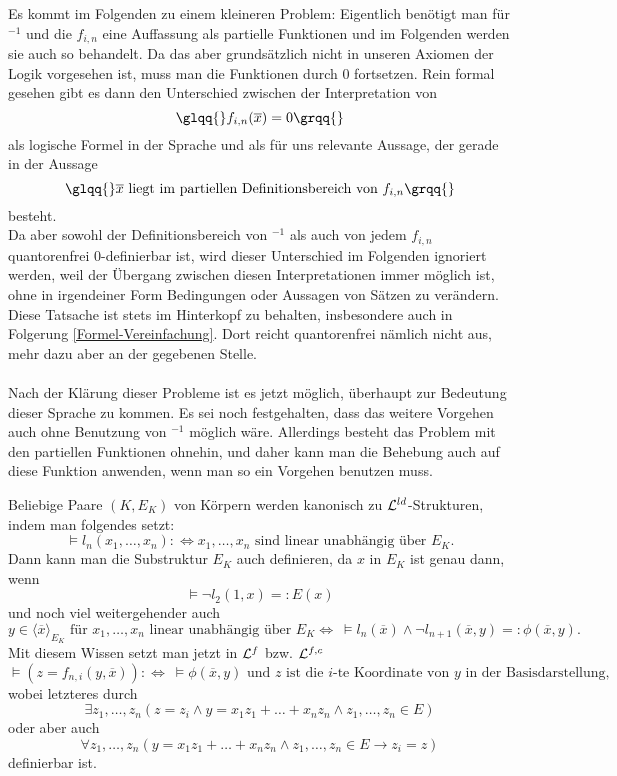     Es kommt im Folgenden zu einem kleineren Problem: Eigentlich benötigt man für $^{-1}$ und die $f_{i,n}$ eine Auffassung als partielle Funktionen und im Folgenden werden sie auch so behandelt. Da das aber grundsätzlich nicht in unseren Axiomen der Logik vorgesehen ist, muss man die Funktionen durch $0$ fortsetzen. Rein formal gesehen gibt es dann den Unterschied zwischen der Interpretation von $$\glqq{}f_{i,n}(\overline{x})=0\grqq{}$$ als logische Formel in der Sprache und als für uns relevante Aussage, der gerade in der Aussage $$\glqq{}\overline{x}\text{ liegt im partiellen Definitionsbereich von }f_{i,n}\grqq{}$$ besteht.\\
    Da aber sowohl der Definitionsbereich von $^{-1}$ als auch von jedem $f_{i,n}$ quantorenfrei 0-definierbar ist, wird dieser Unterschied im Folgenden ignoriert werden, weil der Übergang zwischen diesen Interpretationen immer möglich ist, ohne in irgendeiner Form Bedingungen oder Aussagen von Sätzen zu verändern. Diese Tatsache ist stets im Hinterkopf zu behalten, insbesondere auch in Folgerung \ref{Formel-Vereinfachung}. Dort reicht quantorenfrei nämlich nicht aus, mehr dazu aber an der gegebenen Stelle.\\\\
    Nach der Klärung dieser Probleme ist es jetzt möglich, überhaupt zur Bedeutung dieser Sprache zu kommen. Es sei noch festgehalten, dass das weitere Vorgehen auch ohne Benutzung von \glqq{}$^{-1}$\grqq{} möglich wäre. Allerdings besteht das Problem mit den partiellen Funktionen ohnehin, und daher kann man die Behebung auch auf diese Funktion anwenden, wenn man so ein Vorgehen benutzen muss.
    
    \newpage
    
    \begin{lemma}\label{Symbolik}
    	Beliebige Paare $(K,E_K)$ von Körpern werden kanonisch zu $\mathcal{L}^{ld}$-Strukturen, indem man folgendes setzt:
    	$$\models l_n(x_1,\dots,x_n):\Leftrightarrow x_1,\dots,x_n\text{ sind linear unabhängig über }E_K.$$
    	Dann kann man die Substruktur $E_K$ auch definieren, da $x$ in $E_K$ ist genau dann, wenn $$\models\neg l_2(1,x)=:E(x)$$ und noch viel weitergehender auch $$y\in\langle\overline{x}\rangle_{E_K}\text{ für } x_1,\dots,x_n\text{ linear unabhängig über }E_K\Leftrightarrow\ \models l_n(\overline{x})\land\neg l_{n+1}(\overline{x},y)=:\phi(\overline{x},y).$$
    	Mit diesem Wissen setzt man jetzt in $\mathcal{L}^f$ bzw. $\mathcal{L}^{f,c}$
    	$$\models (z=f_{n,i}(y,\overline{x})):\Leftrightarrow\ \models\phi(\overline{x},y)\text{ und }z\text{ ist die }i\text{-te Koordinate von }y\text{ in der Basisdarstellung},$$
    	wobei letzteres durch $$\exists z_1,\dots,z_n(z=z_i\land y=x_1z_1+\dots+x_nz_n\land z_1,\dots,z_n\in E)$$ oder aber auch $$\forall z_1,\dots,z_n(y=x_1z_1+\dots+x_nz_n\land z_1,\dots,z_n\in E\rightarrow z_i=z)$$ definierbar ist.
    \end{lemma}
    
